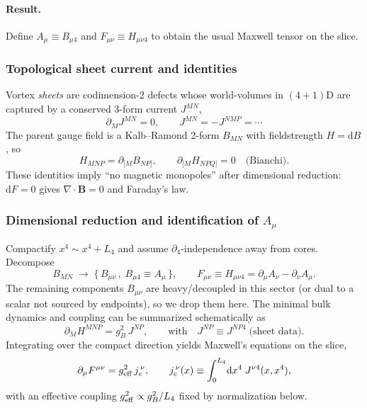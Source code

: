 \paragraph*{Result.} Define $A_\mu\equiv B_{\mu 4}$ and $F_{\mu\nu}\equiv H_{\mu\nu 4}$ to obtain the usual Maxwell tensor on the slice.

\subsubsection{Topological sheet current and identities}
Vortex \emph{sheets} are codimension-2 defects whose world-volumes in $(4{+}1)$D are captured by a conserved 3-form current $J^{MN}$,
\begin{equation}
\partial_M J^{MN} = 0,
\qquad
J^{MN}=-J^{NMP}=\cdots
\end{equation}
The parent gauge field is a Kalb--Ramond 2-form $B_{MN}$ with fieldstrength $H=\mathrm d B$, so
\begin{equation}
H_{MNP}=\partial_{[M}B_{NP]},
\qquad
\partial_{[M}H_{NPQ]}=0\quad\text{(Bianchi)}.
\end{equation}
These identities imply ``no magnetic monopoles'' after dimensional reduction: $\mathrm d F=0$ gives $\nabla\!\cdot\!\mathbf B=0$ and Faraday's law.

\subsubsection{Dimensional reduction and identification of $A_\mu$}
Compactify $x^4\sim x^4+L_4$ and assume $\partial_4$-independence away from cores. Decompose
\begin{equation}
B_{MN}\;\longrightarrow\;\{\,B_{\mu\nu}\,,\;B_{\mu 4}\equiv A_\mu\,\},
\qquad
F_{\mu\nu}\equiv H_{\mu\nu 4}
=\partial_\mu A_\nu-\partial_\nu A_\mu.
\end{equation}
The remaining components $B_{\mu\nu}$ are heavy/decoupled in this sector (or dual to a scalar not sourced by endpoints), so we drop them here. The minimal bulk dynamics and coupling can be summarized schematically as
\begin{equation}
\partial_M H^{MNP}=g_B^{2}\,J^{NP},\qquad \text{with}\quad J^{NP}\equiv J^{NP4} \;\text{(sheet data)}.
\end{equation}
Integrating over the compact direction yields Maxwell's equations on the slice,
\begin{equation}
\partial_\mu F^{\mu\nu}=g_{\rm eff}^2\, j_e^{\,\nu},
\qquad
j_e^{\,\nu}(x)\equiv \int_0^{L_4}\!\mathrm d x^4\; J^{\nu 4}(x,x^4),
\label{eq:maxwell-from-sheets}
\end{equation}
with an effective coupling $g_{\rm eff}^2\propto g_B^2/L_4$ fixed by normalization below.

